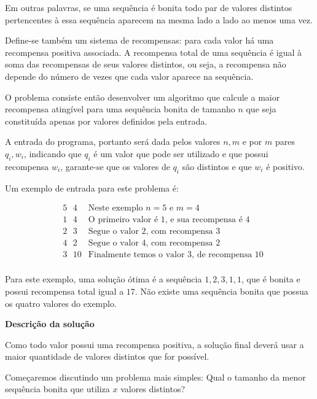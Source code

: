         Em outras palavras, se uma sequência é bonita todo par de valores distintos pertencentes à essa sequência aparecem na mesma lado a lado ao menos uma vez.

        Define-se também um sistema de recompensas:
        para cada valor há uma recompensa positiva associada.
        A recompensa total de uma sequência é igual à soma das recompensas de seus valores distintos, ou seja, a recompensa não depende do número de vezes que cada valor aparece na sequência.

        O problema consiste então desenvolver um algoritmo que calcule a maior recompensa atingível para uma sequência bonita de tamanho $n$ que seja constituída apenas por valores definidos pela entrada. 

        A entrada do programa, portanto será dada pelos valores $n, m$ e por $m$ pares $q_i, w_i$, indicando que $q_i$ é um valor que pode ser utilizado e que possui recompensa $w_i$, garante-se que os valores de $q_i$ são distintos e que $w_i$ é positivo.

        Um exemplo de entrada para este problema é:

        \begin{align*}
            & 5 \text{ }4 & \text{Neste exemplo $n = 5$ e $m = 4$}\\
            & 1 \text{ }4 & \text{O primeiro valor é 1, e sua recompensa é 4}\\
            & 2 \text{ }3 & \text{Segue o valor 2, com recompensa 3}\\
            & 4 \text{ }2 & \text{Segue o valor 4, com recompensa 2}\\
            & 3 \text{ }10 &\text{Finalmente temos o valor 3, de recompensa 10}\\
        \end{align*}

        Para este exemplo, uma solução ótima é a sequência $1,2,3,1,1$, que é bonita e possui recompensa total igual a $17$. 
        Não existe uma sequência bonita que possua os quatro valores do exemplo.


        \textbf{Descrição da solução}

        Como todo valor possui uma recompensa positiva, a solução final deverá usar a maior quantidade de valores distintos que for possível.

        Começaremos discutindo um problema mais simples: Qual o tamanho da menor sequência bonita que utiliza $x$ valores distintos?


